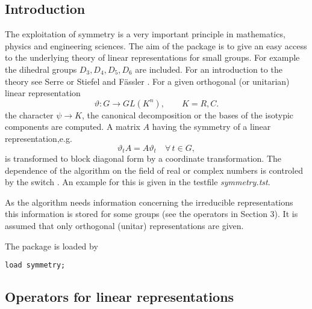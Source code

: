 

\iffalse
This short note describes a package of \REDUCE{} procedures
that compute symmetry-adapted bases and block diagonal forms
of matrices which have the symmetry of a group.
The \package{SYMMETRY} package is the implementation
of the theory of linear representations
for small finite groups such as the dihedral groups.
\fi

\subsection{Introduction}

The exploitation of symmetry is a very important principle in mathematics,
physics and engineering sciences.
The aim of the  package is to give an easy access to the
underlying theory of linear representations for small groups. For
example the
dihedral groups $D_3,D_4,D_5,D_6$ are included.
For an introduction to the theory see {\sc Serre} \cite{Serre:77} or
{\sc Stiefel} and {\sc F\"assler} \cite{StiefelFaessler:79}.
For a given orthogonal (or unitarian) linear representation
\[
\vartheta : G\longrightarrow GL(K^n), \qquad K=R,C.
\]
the character $\psi\rightarrow K$, the
canonical decomposition or the bases of the isotypic
components are computed. A matrix $A$ having the symmetry of a linear
representation,e.g.
\[
\vartheta_t A = A \vartheta_t \quad \forall \, t\in G,
\]
is transformed to block diagonal form by a coordinate
transformation.
The dependence of the algorithm on the
field of real or complex numbers is controled by the switch .
An example for this is given in the testfile \emph{symmetry.tst}.

As the algorithm needs information concerning the irreducible representations
this information is stored for some groups (see the operators in Section 3).
It is assumed that only orthogonal (unitar) representations are given.

The package is loaded by

\texttt{load symmetry;}

\subsection{Operators for linear representations}
\hypertarget{operator:CANONICALDECOMPOSITION}{}
\hypertarget{operator:CHARACTER}{}
\hypertarget{operator:SYMMETRYBASIS}{}
\hypertarget{operator:SYMMETRYBASISPART}{}
\hypertarget{operator:ALLSYMMETRYBASES}{}
\hypertarget{operator:DIAGONALIZE}{}

